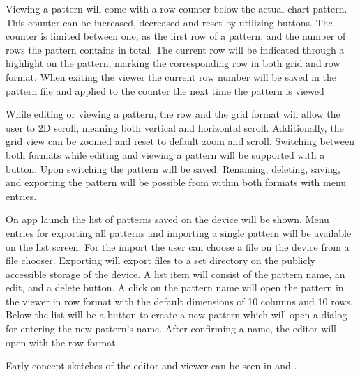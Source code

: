 Viewing a pattern will come with a row counter below the actual chart pattern. This counter can be increased, decreased and reset by utilizing buttons. The counter is limited between one, as the first row of a pattern, and the number of rows the pattern contains in total. The current row will be indicated through a highlight on the pattern, marking the corresponding row in both grid and row format. When exiting the viewer the current row number will be saved in the pattern file and applied to the counter the next time the pattern is viewed

While editing or viewing a pattern, the row and the grid format will allow the user to 2D scroll, meaning both vertical and horizontal scroll. Additionally, the grid view can be zoomed and reset to default zoom and scroll. Switching between both formats while editing and viewing a pattern will be supported with a button. Upon switching the pattern will be saved. Renaming, deleting, saving, and exporting the pattern will be possible from within both formats with menu entries.

On app launch the list of patterns saved on the device will be shown. Menu entries for exporting all patterns and importing a single pattern will be available on the list screen. For the import the user can choose a file on the device from a file chooser. Exporting will export files to a set directory on the publicly accessible storage of the device. A list item will consist of the pattern name, an edit, and a delete button. A click on the pattern name will open the pattern in the viewer in row format with the default dimensions of 10 columns and 10 rows. Below the list will be a button to create a new pattern which will open a dialog for entering the new pattern’s name. After confirming a name, the editor will open with the row format.

Early concept sketches of the editor and viewer can be seen in  and .

